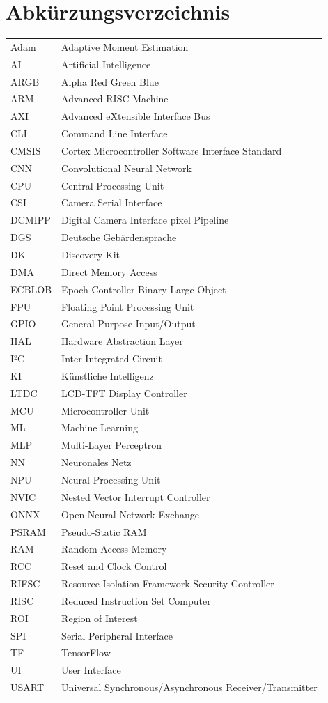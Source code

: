 \chapter*{Abkürzungsverzeichnis}
\label{ch:abkürzung}

\begin{longtable}{l l}
  Adam & Adaptive Moment Estimation \\
  AI & Artificial Intelligence \\
  ARGB & Alpha Red Green Blue \\
  ARM & Advanced RISC Machine \\
  AXI & Advanced eXtensible Interface Bus \\
  CLI & Command Line Interface \\
  CMSIS & Cortex Microcontroller Software Interface Standard \\
  CNN & Convolutional Neural Network \\
  CPU & Central Processing Unit \\
  CSI & Camera Serial Interface \\
  DCMIPP & Digital Camera Interface pixel Pipeline \\
  DGS & Deutsche Gebärdensprache \\
  DK & Discovery Kit \\
  DMA & Direct Memory Access \\
  ECBLOB & Epoch Controller Binary Large Object \\
  FPU & Floating Point Processing Unit \\
  GPIO & General Purpose Input/Output \\
  HAL & Hardware Abstraction Layer \\
  I²C & Inter-Integrated Circuit \\
  KI & Künstliche Intelligenz \\
  LTDC & LCD-TFT Display Controller \\
  MCU & Microcontroller Unit \\
  ML & Machine Learning \\
  MLP & Multi-Layer Perceptron \\
  NN & Neuronales Netz \\
  NPU & Neural Processing Unit \\
  NVIC & Nested Vector Interrupt Controller \\
  ONNX & Open Neural Network Exchange \\
  PSRAM & Pseudo-Static RAM \\
  RAM & Random Access Memory \\
  RCC & Reset and Clock Control \\
  RIFSC & Resource Isolation Framework Security Controller \\
  RISC & Reduced Instruction Set Computer \\
  ROI & Region of Interest \\
  SPI & Serial Peripheral Interface \\
  TF & TensorFlow \\
  UI & User Interface \\
  USART & Universal Synchronous/Asynchronous Receiver/Transmitter \\
\end{longtable}
